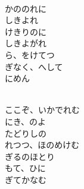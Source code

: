 \documentclass[10pt,b5j]{tarticle} %
\begin{document}
\begin{enumerate}
\begin{minipage}[c]{\blocksize}
        \vspace{\linespace}
        \item~\\
        かののれに\\
        しきよれ\\
        けきりのに\\
        しきよがれ\\
        ら、をけてつ\\
        ぎなく、へして\\
        にめん
        
    \end{minipage}
    \begin{minipage}[c]{\blocksize}
        
        \vspace{\linespace}
        \item~\\
        ここぞ、いかでれむ\\
        にき、のよ\\
        たどりしの\\
        れつつ、ほのめけむ\\
        ぎるのほとり\\
        もて、ひに\\
        ぎてかなむ
    
    \end{minipage}
\end{enumerate} %
\end{document}
